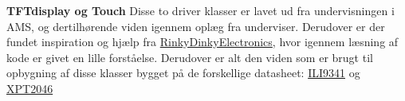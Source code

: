 \textbf{TFTdisplay og Touch}
Disse to driver klasser er lavet ud fra undervisningen i AMS, og dertilhørende viden igennem oplæg fra underviser. Derudover er der fundet inspiration og hjælp fra \href{http://www.rinkydinkelectronics.com/library.php}{RinkyDinkyElectronics}, hvor igennem læsning af kode er givet en lille forståelse. Derudover er alt den viden som er brugt til opbygning af disse klasser bygget på de forskellige datasheet: \href{https://blackboard.au.dk/bbcswebdav/pid-1697983-dt-content-rid-3847230_1/courses/BB-Cou-UUVA-73302/BB-Cou-UUVA-65758_ImportedContent_20170106021228/BB-Cou-STADS-UUVA-52360_ImportedContent_20160107025559/LAB/Lab3a%20Graphic%20LCD%20Display/Files%20for%20LAB3a/ILI9341_v1.11.pdf}{ILI9341} 
og 
\href{https://blackboard.au.dk/bbcswebdav/pid-1762166-dt-content-rid-4251461_1/courses/BB-Cou-UUVA-73302/BB-Cou-UUVA-65758_ImportedContent_20170106021228/BB-Cou-STADS-UUVA-52360_ImportedContent_20160107025559/LAB/LAB10%20Touch%20Screen%20Driver/Files%20for%20LAB10/XPT2046.pdf}{XPT2046}